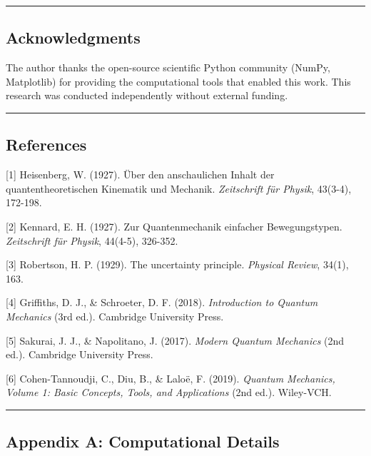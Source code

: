 \documentclass[
  11pt,
]{article}
\begin{document}
\begin{center}\rule{0.5\linewidth}{0.5pt}\end{center}

\subsection{Acknowledgments}\label{acknowledgments}

The author thanks the open-source scientific Python community (NumPy,
Matplotlib) for providing the computational tools that enabled this
work. This research was conducted independently without external
funding.

\begin{center}\rule{0.5\linewidth}{0.5pt}\end{center}

\subsection{References}\label{references}

{[}1{]} Heisenberg, W. (1927). Über den anschaulichen Inhalt der
quantentheoretischen Kinematik und Mechanik. \emph{Zeitschrift für
Physik}, 43(3-4), 172-198.

{[}2{]} Kennard, E. H. (1927). Zur Quantenmechanik einfacher
Bewegungstypen. \emph{Zeitschrift für Physik}, 44(4-5), 326-352.

{[}3{]} Robertson, H. P. (1929). The uncertainty principle.
\emph{Physical Review}, 34(1), 163.

{[}4{]} Griffiths, D. J., \& Schroeter, D. F. (2018). \emph{Introduction
to Quantum Mechanics} (3rd ed.). Cambridge University Press.

{[}5{]} Sakurai, J. J., \& Napolitano, J. (2017). \emph{Modern Quantum
Mechanics} (2nd ed.). Cambridge University Press.

{[}6{]} Cohen-Tannoudji, C., Diu, B., \& Laloë, F. (2019). \emph{Quantum
Mechanics, Volume 1: Basic Concepts, Tools, and Applications} (2nd ed.).
Wiley-VCH.

\begin{center}\rule{0.5\linewidth}{0.5pt}\end{center}

\subsection{Appendix A: Computational
Details}\label{appendix-a-computational-details}
\end{document}
